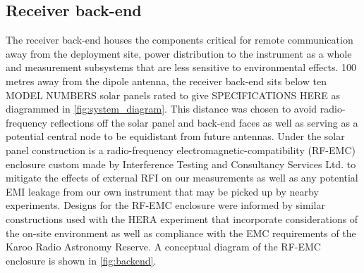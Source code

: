 \subsection{Receiver back-end}\label{sec:backend}
The receiver back-end houses the components critical for remote communication away from the deployment site, power distribution to the instrument as a whole and measurement subsystems that are less sensitive to environmental effects. 100 metres away from the dipole antenna, the receiver back-end sits below ten MODEL NUMBERS solar panels rated to give SPECIFICATIONS HERE as diagrammed in \cref{fig:system_diagram}. This distance was chosen to avoid radio-frequency reflections off the solar panel and back-end faces as well as serving as a potential central node to be equidistant from future antennas. Under the solar panel construction is a radio-frequency electromagnetic-compatibility (RF-EMC) enclosure custom made by Interference Testing and Consultancy Services Ltd. to mitigate the effects of external RFI on our measurements as well as any potential EMI leakage from our own instrument that may be picked up by nearby experiments. Designs for the RF-EMC enclosure were informed by similar constructions used with the HERA experiment that incorporate considerations of the on-site environment as well as compliance with the EMC requirements of the Karoo Radio Astronomy Reserve. A conceptual diagram of the RF-EMC enclosure is shown in \cref{fig:backend}.

